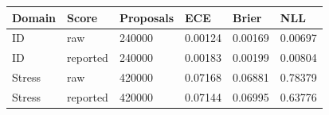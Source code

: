\begin{tabular}{llllll}
\toprule
Domain & Score & Proposals & ECE & Brier & NLL \\
\midrule
ID & raw & 240000 & 0.00124 & 0.00169 & 0.00697 \\
ID & reported & 240000 & 0.00183 & 0.00199 & 0.00804 \\
Stress & raw & 420000 & 0.07168 & 0.06881 & 0.78379 \\
Stress & reported & 420000 & 0.07144 & 0.06995 & 0.63776 \\
\bottomrule
\end{tabular}
